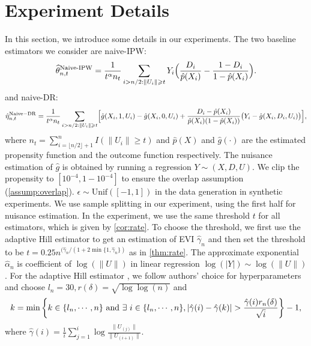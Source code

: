 \documentclass[12pt]{article}
\theoremstyle{plain}
\theoremstyle{definition}
\begin{document}
\section{Experiment Details}
In this section, we introduce some details in our experiments. The two baseline estimators we consider are naive-IPW: 
\begin{align*}
    \widehat{\theta}_{n,t}^{\text{Naive-IPW}} = \frac{1}{t^\alpha n_t}\sum_{i>n/2: \|U_i\|\geqslant t} Y_i \Bigl(\frac{D_i}{\hat p(X_i)} - \frac{1-D_i}{1-\hat p(X_i)}\Bigr) .\label{eq:eta_ipw}
\end{align*}
and naive-DR: 
\begin{align*}
    \hat\eta_{n,t}^{\mathrm{Naive-DR}} = \frac{1}{t^\alpha n_t} \sum_{i> n/2: \|U_i\|\geqslant t}\Bigl[\hat g(X_i,1,U_i)-\hat g(X_i,0,U_i) + \frac{D_i-\hat p(X_i)}{\hat p(X_i)(1-\hat p(X_i))}\bigl(Y_i-\hat g(X_i,D_i,U_i)\bigr)\Bigr],
\end{align*}
where $n_t = \sum_{i= \lfloor n/2 \rfloor + 1}^{n} I(\|U_i\|\geqslant t)$ and  $\hat{p}(X)$ and $ \hat{g}(\cdot)$ are the estimated propensity function and the outcome function respectively. The nuisance estimation of $\hat{g}$ is obtained by running a regression $Y\sim (X,D,U)$. We clip the propensity to $[10^{-4}, 1 -10^{-4}]$ to ensure the overlap assumption (\cref{assump:overlap}). $\epsilon \sim \text{Unif} ([-1,1])$ in the data generation in synthetic experiments. We use sample splitting in our experiment, using the first half for nuisance estimation. In the experiment, we use the same threshold $t$ for all estimators, which is given by \cref{cor:rate}. To choose the threshold, we first use the adaptive Hill estimator \cite{boucheron2015tail} to get an estimation of EVI $\hat{\gamma}_{n}$ and then set the threshold to be $t = 0.25n^{(\hat{\gamma}_{n} / (1 + 2 \min \{1, \hat{\gamma}_{n} \})}$ as in \cref{thm:rate}. The approximate exponential $ \hat{\alpha}_n $ is coefficient of $\log(\|U\|)$ in linear regression $\log(|Y|) \sim \log(\|U\|)$. For the adaptive Hill estimator \cite{boucheron2015tail}, we follow authors' choice for hyperparameters and choose $l_n = 30, r(\delta) = \sqrt{\log\log(n)}$ and 
\begin{equation}
           k  = \min \left\{ k \in \{l_n, \cdots, n\} \  \text{and} \  \exists \ i \in \{l_n,\cdots, n\}, | \hat{\gamma}(i) - \hat{\gamma}(k) | > \frac{\hat{\gamma}(i) r_n (\delta)}{\sqrt{i}} \right\} - 1, \notag
\end{equation}
where $\hat{\gamma}(i) = \frac{1}{i} \sum_{j=1}^{i} \log\frac{\|U_{(j)}\|}{\|U_{(i+1)}\|}$.
\end{document}

